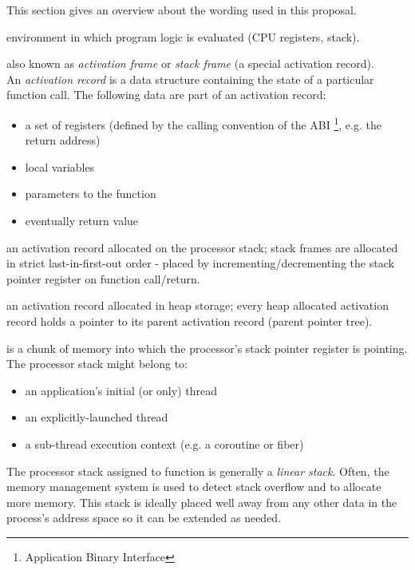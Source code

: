 This section gives an overview about the wording used in this proposal.

environment in which program logic is evaluated (CPU registers, stack).

also known as \emph{activation frame} or \emph{stack frame} (a special
activation record).\\
An \emph{activation record} is a data structure containing the state of a
particular function call. The following data are part of an activation record:
\begin{itemize}
    \item a set of registers (defined by the calling convention of the ABI
        \footnote{Application Binary Interface}, e.g. the return address)
    \item local variables
    \item parameters to the function
    \item eventually return value
\end{itemize}

an activation record allocated on the processor stack; stack frames are
allocated in strict last-in-first-out order - placed by
incrementing/decrementing the stack pointer register on function call/return.

an activation record allocated in heap storage; every heap allocated activation
record holds a pointer to its parent activation record (parent pointer tree).

is a chunk of memory into which the processor's stack pointer register is
pointing. The processor stack might belong to:
\begin{itemize}
    \item an application's initial (or only) thread
    \item an explicitly-launched thread
    \item a sub-thread execution context (e.g. a coroutine or fiber)
\end{itemize}

The processor stack assigned to function \main is generally a \emph{linear
stack}. Often, the memory management system is used to detect stack
overflow and to allocate more memory. This stack is ideally placed well away
from any other data in the process's address space so it can be extended as
needed.

